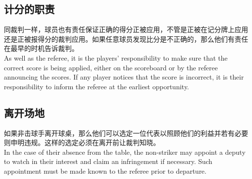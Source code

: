 \subsection{计分的职责}

\noindent 同裁判一样，球员也有责任保证正确的得分正被应用，不管是正被在记分牌上应用还是正被报得分的裁判应用。如果任意球员发现比分是不正确的，那么他们有责任在最早的时机告诉裁判。\\
As well as the referee, it is the players' responsibility to make sure that the correct score is being applied, either on the scoreboard or by the referee announcing the scores. If any player notices that the score is incorrect, it is their responsibility to inform the referee at the earliest opportunity.

\subsection{离开场地}

\noindent 如果非击球手离开球桌，那么他们可以选定一位代表以照顾他们的利益并若有必要则申明违规。这样的选定必须在离开前让裁判知晓。\\
In the case of their absence from the table, the non-striker may appoint a deputy to watch in their interest and claim an infringement if necessary. Such appointment must be made known to the referee prior to departure.
